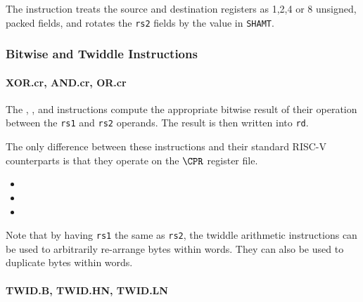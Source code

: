 The instruction  treats the source and destination registers as
1,2,4 or 8 unsigned, packed fields, and rotates the {\tt rs2} fields by
the value in {\tt SHAMT}.

\subsubsection{Bitwise and Twiddle Instructions}

\paragraph{XOR.cr, AND.cr, OR.cr}

The , , and  instructions compute the
appropriate bitwise result of their operation between the {\tt rs1} and
{\tt rs2} operands. The result is then written into {\tt rd}.

The only difference between these instructions and their standard RISC-V
counterparts is that they operate on the $\CPR$ register file.

\begin{itemize}
\item {}
\item {}
\item {}
\end{itemize}

Note that by having {\tt rs1} the same as {\tt rs2}, the twiddle
arithmetic instructions can be used to arbitrarily re-arrange bytes
within words. They can also be used to duplicate bytes within words.

\paragraph{TWID.B, TWID.HN, TWID.LN}

